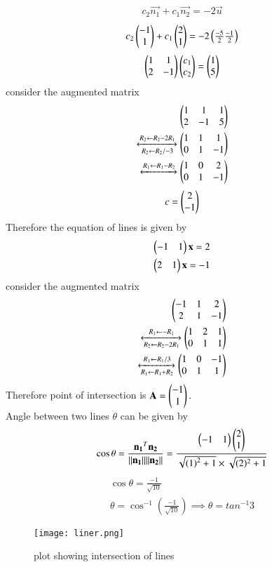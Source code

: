 \documentclass[journal,12pt,twocolumn]{IEEEtran}
\begin{document}
\begin{align}
c_2\vec{n_1}+c_1\vec{n_2} =-2\vec{u}
 \end{align}
 \begin{align}
 c_2\begin{pmatrix}-1\\1\end{pmatrix}+c_1\begin{pmatrix}2\\1\end{pmatrix} =-2\begin{pmatrix}\frac{-5}{2}\frac{-1}{2}\end{pmatrix}
 \end{align}
 \begin{align}
 \begin{pmatrix}1&1\\2&-1\end{pmatrix}\begin{pmatrix}c_1\\c_2\end{pmatrix}=\begin{pmatrix}1\\5\end{pmatrix}
 \end{align}
 consider the augmented matrix
 \begin{align}
\begin{pmatrix}1&1&1\\2&-1&5\end{pmatrix}\\
\xleftrightarrow[R_2\leftarrow R_2/-3]{R_2\leftarrow R_2-2R_1}
\begin{pmatrix}1&1&1\\0&1&-1\end{pmatrix}\\\xleftrightarrow[]{R_1\leftarrow R_1-R_2}
\begin{pmatrix}1&0&2\\0&1&-1\end{pmatrix}
\end{align}
\begin{align}
c = \begin{pmatrix}2\\-1\end{pmatrix}
\end{align}
Therefore the equation of lines is given by 
\begin{align}
\begin{pmatrix}-1&1\end{pmatrix}\mathbf{x}=2\\
\begin{pmatrix}2&1\end{pmatrix}\mathbf{x}=-1
\end{align}
consider the augmented matrix
\begin{align}
\begin{pmatrix}-1&1&2\\2&1&-1\end{pmatrix}\\
\xleftrightarrow[R_2\leftarrow R_2-2R_1]{R_1\leftarrow -R_1}
\begin{pmatrix}1&2&1\\0&1&1\end{pmatrix}\\\xleftrightarrow[R_1\leftarrow R_1+R_2]{R_1\leftarrow R_1/3}
\begin{pmatrix}1&0&-1\\0&1&1\end{pmatrix}
\end{align}
Therefore point of intersection is $\mathbf{A}=\begin{pmatrix}-1\\1\end{pmatrix}.$
\\
Angle between two lines $\theta$ can be given by
\begin{align}
\cos\theta =\frac{\mathbf{n_1}^T\mathbf{n_2}}{\lVert\mathbf{n_1}\rVert\lVert\mathbf{n_2}\rVert}=
\frac{\begin{pmatrix}-1&1\end{pmatrix}\begin{pmatrix}2\\1\end{pmatrix}}{\sqrt{\left(1\right)^2 +1} \times \sqrt{(2)^2 +1}}
\end{align}
\begin{align}
\cos\theta=\frac{-1}{\sqrt{10}}\\
\theta = \cos^{-1}(\frac{-1}{\sqrt{10}})\implies \theta = tan^{-1}3
\end{align}
\begin{figure}[!ht]
\centering
\texttt{[image: liner.png]}
\caption{plot showing intersection of lines}
\label{Fig}
\end{figure}
\end{document}
